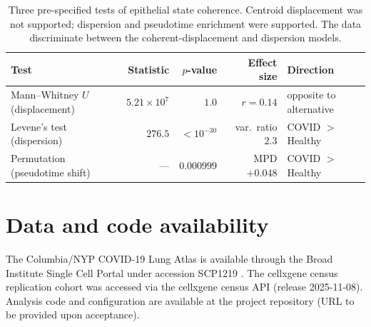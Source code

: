\documentclass[11pt]{article}
\begin{document}
\begin{table}[H]
\centering
\small
\begin{tabular}{lrrrl}
\toprule
Test & Statistic & $p$-value & Effect size & Direction \\
\midrule
Mann--Whitney $U$ (displacement) & $5.21 \times 10^{7}$ & $1.0$ & $r = 0.14$ & opposite to alternative \\
Levene's test (dispersion) & $276.5$ & $< 10^{-30}$ & var.\ ratio $2.3$ & COVID $>$ Healthy \\
Permutation (pseudotime shift) & --- & $0.000999$ & MPD $+0.048$ & COVID $>$ Healthy \\
\bottomrule
\end{tabular}
\caption{Three pre-specified tests of epithelial state coherence. Centroid displacement was not supported; dispersion and pseudotime enrichment were supported. The data discriminate between the coherent-displacement and dispersion models.}
\label{tab:tab2}
\end{table}

\section*{Data and code availability}

The Columbia/NYP COVID-19 Lung Atlas is available through the Broad Institute Single Cell Portal under accession SCP1219 \citep{Melms2021}. The cellxgene census replication cohort was accessed via the cellxgene census API (release 2025-11-08). Analysis code and configuration are available at the project repository (URL to be provided upon acceptance).
\end{document}
